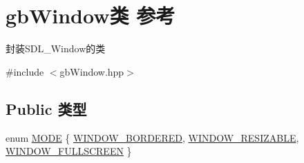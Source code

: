 \hypertarget{classgb_window}{}\section{gb\+Window类 参考}
\label{classgb_window}


封装\+S\+D\+L\+\_\+\+Window的类  




{\ttfamily \#include $<$gb\+Window.\+hpp$>$}

\subsection*{Public 类型}
\begin{DoxyCompactItemize}
\item 
enum \mbox{\hyperlink{classgb_window_a19e70d277e17598ddb3c229e28dbb9e9}{M\+O\+DE}} \{ \mbox{\hyperlink{classgb_window_a19e70d277e17598ddb3c229e28dbb9e9a5740824054b0e553087697d3bd125fe8}{W\+I\+N\+D\+O\+W\+\_\+\+B\+O\+R\+D\+E\+R\+ED}}, 
\mbox{\hyperlink{classgb_window_a19e70d277e17598ddb3c229e28dbb9e9abd206e493c11e82b172da8577883cc82}{W\+I\+N\+D\+O\+W\+\_\+\+R\+E\+S\+I\+Z\+A\+B\+LE}}, 
\mbox{\hyperlink{classgb_window_a19e70d277e17598ddb3c229e28dbb9e9a0d12505e22d971c669ff572a2e618f55}{W\+I\+N\+D\+O\+W\+\_\+\+F\+U\+L\+L\+S\+C\+R\+E\+EN}}
 \}
\end{DoxyCompactItemize}
